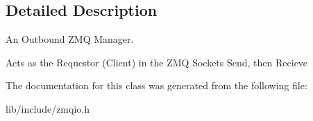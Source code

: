 \subsection{Detailed Description}
An Outbound Z\-M\-Q Manager. 

Acts as the Requestor (Client) in the Z\-M\-Q Sockets Send, then Recieve 

The documentation for this class was generated from the following file\-:\begin{DoxyCompactItemize}
\item 
lib/include/zmqio.\-h\end{DoxyCompactItemize}
